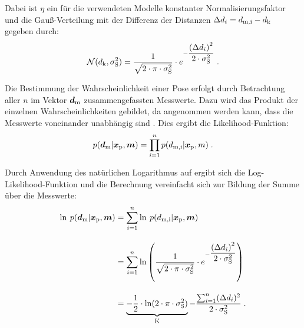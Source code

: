 
Dabei ist $\eta$ ein für die verwendeten Modelle konstanter Normalisierungsfaktor und die Gauß-Verteilung mit der Differenz der Distanzen ${\Delta d}_i = d_{{\mathrm{m,i}}}-d_{{\mathrm{k}}}$  gegeben durch:
%
\begin{equation}
\mathcal{N}(d_{{\mathrm{k}}},\sigma_{{\mathrm{S}}}^2) = \frac{1}{\sqrt{2 \cdot \pi \cdot \sigma_{{\mathrm{S}}}^2}}  \cdot e^{-\dfrac{{({\Delta d}_i)}^2}{2 \cdot \sigma_{{\mathrm{S}}}^2}} \; \text{.}
\end{equation}

Die Bestimmung der Wahrscheinlichkeit einer Pose erfolgt durch Betrachtung aller $n$ im Vektor $\mbox{\boldmath{$d$}}_{{\mathrm{m}}}$ zusammengefassten Messwerte. Dazu wird das Produkt der einzelnen Wahrscheinlichkeiten gebildet, da angenommen werden kann, dass die Messwerte voneinander unabhängig sind \cite{Hornung2010}. Dies ergibt die Likelihood-Funktion:
%
\begin{equation}
\label{eq.likelihood}
p(\mbox{\boldmath{$d$}}_{{\mathrm{m}}}|\mbox{\boldmath{$x$}}_{{\mathrm{p}}},\mbox{\boldmath{$m$}}) = \prod_{i=1}^{n}p(d_{{\mathrm{m,i}}}|\mbox{\boldmath{$x$}}_{{\mathrm{p}}},m) \; \text{.}
\end{equation}

Durch Anwendung des natürlichen Logarithmus auf  ergibt sich die Log-Likelihood-Funktion und die Berechnung vereinfacht sich zur Bildung der Summe über die Messwerte:
%
\begin{equation}
\begin{split}
\ln \: p(\mbox{\boldmath{$d$}}_{{\mathrm{m}}}|\mbox{\boldmath{$x$}}_{{\mathrm{p}}},\mbox{\boldmath{$m$}}) & = \sum_{i=1}^{n} \ln \: p(d_{{\mathrm{m,i}}}|\mbox{\boldmath{$x$}}_{{\mathrm{p}}},\mbox{\boldmath{$m$}}) \\[1em]
& = \sum_{i=1}^{n}\ln \left( \frac{1}{\sqrt{2 \cdot \pi \cdot \sigma_{{\mathrm{S}}}^2}} \cdot e^{-\dfrac{{({\Delta d}_i)}^2}{2 \cdot \sigma_{{\mathrm{S}}}^2}} \right)\\[1em]
& = \underbrace{-\frac{1}{2} \cdot \ln(2 \cdot \pi \cdot\sigma_{{\mathrm{S}}}^2)}_{{\mathrm{K}}}-\dfrac{\sum_{i=1}^{n}({\Delta d}_i)^2}{2 \cdot \sigma_{{\mathrm{S}}}^2}
 \; \text{.} \end{split}
\end{equation}

